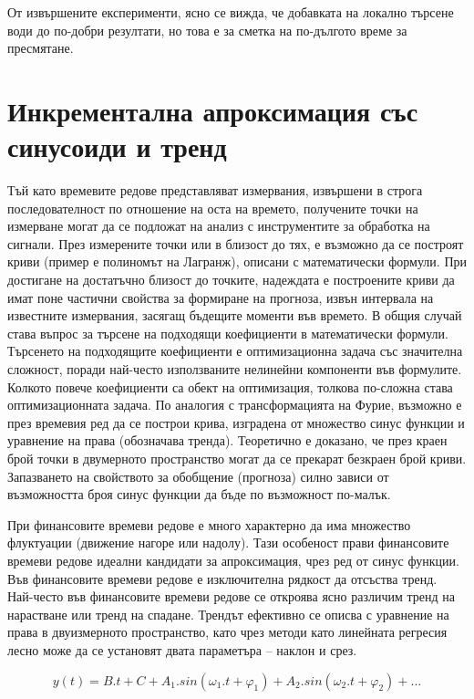 От извършените експерименти, ясно се вижда, че добавката на локално търсене води до по-добри резултати, но това е за сметка на по-дългото време за пресмятане.

\section{Инкрементална апроксимация със синусоиди и тренд}

Тъй като времевите редове представляват измервания, извършени в строга последователност по отношение на оста на времето, получените точки на измерване могат да се подложат на анализ с инструментите за обработка на сигнали. През измерените точки или в близост до тях, е възможно да се построят криви (пример е полиномът на Лагранж), описани с математически формули. При достигане на достатъчно близост до точките, надеждата е построените криви да имат поне частични свойства за формиране на прогноза, извън интервала на известните измервания, засягащ бъдещите моменти във времето. В общия случай става въпрос за търсене на подходящи коефициенти в математически формули. Търсенето на подходящите коефициенти е оптимизационна задача със значителна сложност, поради най-често използваните нелинейни компоненти във формулите. Колкото повече коефициенти са обект на оптимизация, толкова по-сложна става оптимизационната задача. По аналогия с трансформацията на Фурие, възможно е през времевия ред да се построи крива, изградена от множество синус функции и уравнение на права (обозначава тренда). Теоретично е доказано, че през краен брой точки в двумерното пространство могат да се прекарат безкраен брой криви. Запазването на свойството за обобщение (прогноза) силно зависи от възможността броя синус функции да бъде по възможност по-малък. 

При финансовите времеви редове е много характерно да има множество флуктуации (движение нагоре или надолу). Тази особеност прави финансовите времеви редове идеални кандидати за апроксимация, чрез ред от синус функции. Във финансовите времеви редове е изключителна рядкост да отсъства тренд. Най-често във финансовите времеви редове се откроява ясно различим тренд на нарастване или тренд на спадане. Трендът ефективно се описва с уравнение на права в двуизмерното пространство, като чрез методи като линейната регресия лесно може да се установят двата параметъра – наклон и срез. 

\begin{equation}  \label{equ001}
y(t) = B.t + C + A_1.sin(\omega_1.t+\varphi_1) + A_2.sin(\omega_2.t+\varphi_2) + ...
\end{equation}

